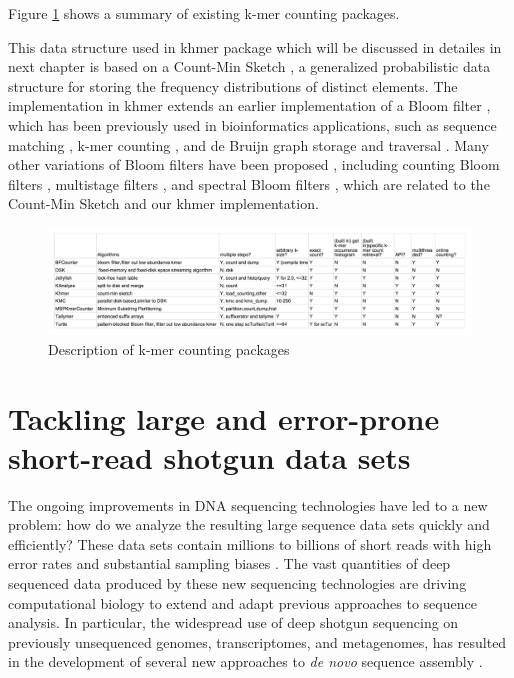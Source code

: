 Figure \ref{fig:kmer_counting} shows a summary of existing k-mer counting
packages.


 This data structure used in khmer package which will be discussed in detailes
 in next chapter is based on a Count-Min Sketch \cite{Cormode2005}, a
 generalized probabilistic data structure for storing the frequency
 distributions of distinct elements. The implementation in khmer extends an earlier
 implementation of a Bloom filter \cite{Bloom70}, which has been previously
 used in bioinformatics applications, such as sequence matching
 \cite{DBLP:conf/padl/MaldeO09}, k-mer counting \cite{Melsted2011}, and de
 Bruijn graph storage and traversal \cite{Pell2012,Jones:2012aa}. Many other
 variations of Bloom filters have been proposed \cite{BroderM03}, including
 counting Bloom filters \cite{Fan:2000:SCS:343571.343572}, multistage filters
 \cite{DBLP:conf/sigcomm/EstanV02}, and spectral Bloom filters
 \cite{DBLP:conf/sigmod/CohenM03}, which are related to the Count-Min Sketch
 and our khmer implementation.

\begin{figure}
\centerline{\includegraphics[width=10in]{./figures/kmer_counting.png}}

    \caption{Description of k-mer counting packages} \label{fig:kmer_counting}
    \end{figure}

\section{Tackling large and error-prone short-read shotgun data sets}

The ongoing improvements in DNA sequencing technologies have led to a new
problem: how do we analyze the resulting large sequence data sets quickly and
efficiently? These data sets contain millions to billions of short reads with
high error rates and substantial sampling biases \cite{pubmed19997069}.  The
vast quantities of deep sequenced data produced by these new sequencing
technologies are driving computational biology to extend and adapt previous
approaches to sequence analysis.  In particular, the widespread use of deep
shotgun sequencing on previously unsequenced genomes, transcriptomes, and
metagenomes, has resulted in the development of several new approaches to {\em
de novo} sequence assembly \cite{pubmed20211242}.

